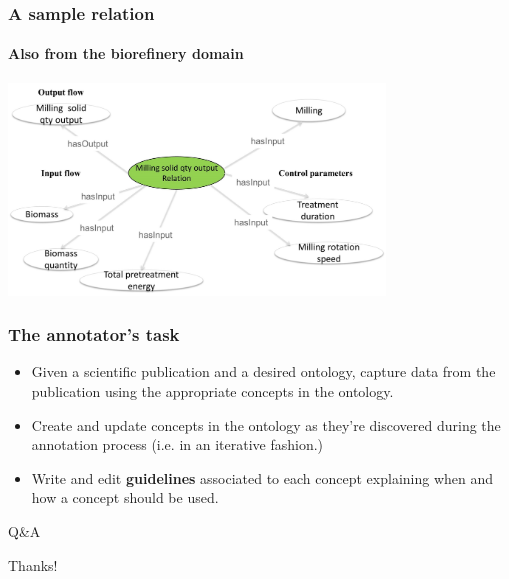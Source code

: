 \documentclass{beamer}
\begin{document}
\begin{frame}
  \frametitle{A sample relation}
  \framesubtitle{Also from the biorefinery domain}

  \begin{center}
    \includegraphics[width=10cm]{relation.jpg}
  \end{center}
\end{frame}

\begin{frame}
  \frametitle{The annotator's task}

  \begin{itemize}
    \item Given a scientific publication and a desired ontology, capture data from the publication using the appropriate concepts in the ontology.

    \pause

    \item Create and update concepts in the ontology as they're discovered during the annotation process (i.e. in an iterative fashion.)

    \pause

  \item Write and edit \textbf{guidelines} associated to each concept explaining when and how a concept should be used.
  \end{itemize}
\end{frame}

\begin{frame}
  \begin{center}
    \Huge{Q\&A}
  \end{center}
\end{frame}

\begin{frame}
  \begin{center}
    \Huge{Thanks!}
  \end{center}
\end{frame}
\end{document}
